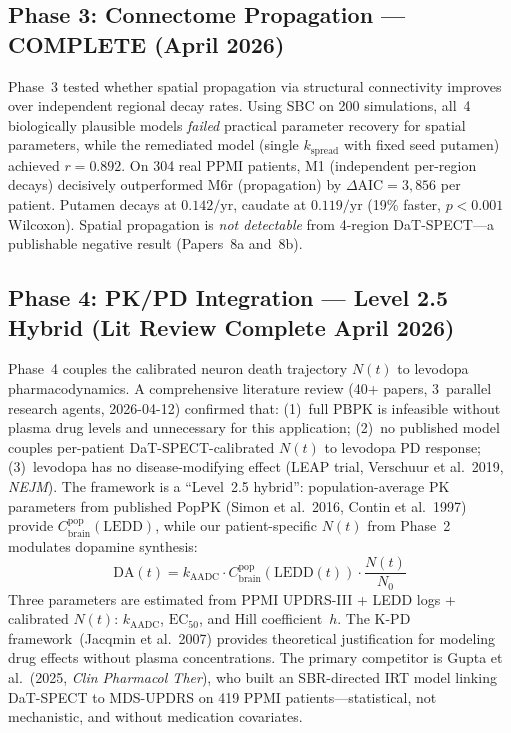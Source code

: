 \subsection{Phase 3: Connectome Propagation --- COMPLETE (April 2026)}

Phase~3 tested whether spatial propagation via structural connectivity improves over independent regional decay rates. Using SBC on 200 simulations, all~4 biologically plausible models \emph{failed} practical parameter recovery for spatial parameters, while the remediated model (single $k_\text{spread}$ with fixed seed putamen) achieved $r=0.892$. On 304 real PPMI patients, M1 (independent per-region decays) decisively outperformed M6r (propagation) by $\Delta\text{AIC}=3{,}856$ per patient. Putamen decays at $0.142/\text{yr}$, caudate at $0.119/\text{yr}$ (19\% faster, $p<0.001$ Wilcoxon). Spatial propagation is \emph{not detectable} from 4-region DaT-SPECT---a publishable negative result (Papers~8a and~8b).

\subsection{Phase 4: PK/PD Integration --- Level 2.5 Hybrid (Lit Review Complete April 2026)}

Phase~4 couples the calibrated neuron death trajectory $N(t)$ to levodopa pharmacodynamics. A comprehensive literature review (40+ papers, 3~parallel research agents, 2026-04-12) confirmed that: (1)~full PBPK is infeasible without plasma drug levels and unnecessary for this application; (2)~no published model couples per-patient DaT-SPECT-calibrated $N(t)$ to levodopa PD response; (3)~levodopa has no disease-modifying effect (LEAP trial, Verschuur et al.\ 2019, \emph{NEJM}). The framework is a ``Level~2.5 hybrid'': population-average PK parameters from published PopPK (Simon et al.\ 2016, Contin et al.\ 1997) provide $C_\text{brain}^\text{pop}(\text{LEDD})$, while our patient-specific $N(t)$ from Phase~2 modulates dopamine synthesis:
\begin{equation}
\text{DA}(t) = k_\text{AADC} \cdot C_\text{brain}^\text{pop}(\text{LEDD}(t)) \cdot \frac{N(t)}{N_0}
\label{eq:da-hybrid}
\end{equation}
Three parameters are estimated from PPMI UPDRS-III + LEDD logs + calibrated $N(t)$: $k_\text{AADC}$, $\text{EC}_{50}$, and Hill coefficient~$h$. The K-PD framework~(Jacqmin et al.\ 2007) provides theoretical justification for modeling drug effects without plasma concentrations. The primary competitor is Gupta et al.\ (2025, \emph{Clin Pharmacol Ther}), who built an SBR-directed IRT model linking DaT-SPECT to MDS-UPDRS on 419 PPMI patients---statistical, not mechanistic, and without medication covariates.

